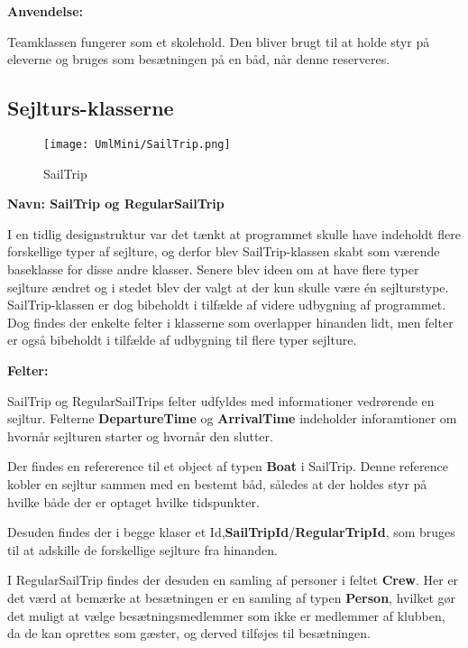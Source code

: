 \textbf{Anvendelse:}

Teamklassen fungerer som et skolehold. Den bliver brugt til at holde styr på eleverne og bruges som besætningen på en båd, når denne reserveres. 


 
\subsection*{Sejlturs-klasserne}
\begin{wrapfigure}{l}{0.4\textwidth}
    \label{img:SailTrip}
    \vspace{-20pt}
    \begin{center}
        \texttt{[image: UmlMini/SailTrip.png]}
    \end{center}
    \vspace{-20pt}
    \caption{SailTrip}
    \vspace{-10pt}
\end{wrapfigure}
\textbf{Navn: SailTrip og RegularSailTrip}

I en tidlig designstruktur var det tænkt at programmet skulle have indeholdt flere forskellige typer af sejlture, og derfor blev SailTrip-klassen skabt som værende baseklasse for disse andre klasser. 
Senere blev ideen om at have flere typer sejlture ændret og i stedet blev der valgt at der kun skulle være én sejlturstype. 
SailTrip-klassen er dog bibeholdt i tilfælde af videre udbygning af programmet.
Dog findes der enkelte felter i klasserne som overlapper hinanden lidt, men felter er også bibeholdt i tilfælde af udbygning til flere typer sejlture.

\textbf{Felter:}

SailTrip og RegularSailTrips felter udfyldes med informationer vedrørende en sejltur.
Felterne \textbf{DepartureTime} og \textbf{ArrivalTime} indeholder inforamtioner om hvornår sejlturen starter og hvornår den slutter.

Der findes en refererence til et object af typen \textbf{Boat} i SailTrip.
Denne reference kobler en sejltur sammen med en bestemt båd, således at der holdes styr på hvilke både der er optaget hvilke tidspunkter.

Desuden findes der i begge klaser et Id,\textbf{SailTripId}/\textbf{RegularTripId}, som bruges til at adskille de forskellige sejlture fra hinanden.

I RegularSailTrip findes der desuden en samling af personer i feltet \textbf{Crew}.
Her er det værd at bemærke at besætningen er en samling af typen \textbf{Person}, hvilket gør det muligt at vælge besætningsmedlemmer som ikke er medlemmer af klubben, da de kan oprettes som gæster, og derved tilføjes til besætningen.

